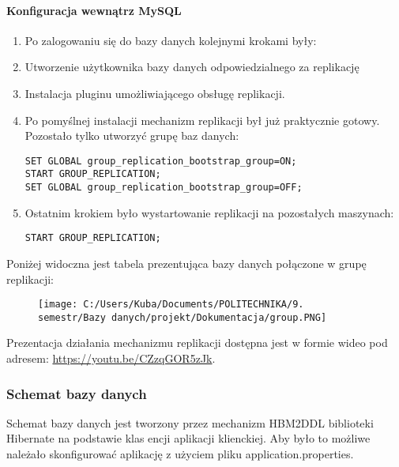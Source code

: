 \documentclass[]{article}
\let\oldparagraph\paragraph
\renewcommand{\paragraph}[1]{\oldparagraph{#1}\mbox{}}
\begin{document}
\hypertarget{header-n75}{%
\paragraph{Konfiguracja wewnątrz MySQL}\label{header-n75}}

\begin{enumerate}
\def\labelenumi{\arabic{enumi}.}
\item
  Po zalogowaniu się do bazy danych kolejnymi krokami były:
\item
  Utworzenie użytkownika bazy danych odpowiedzialnego za replikację
\item
  Instalacja pluginu umożliwiającego obsługę replikacji.
\item
  Po pomyślnej instalacji mechanizm replikacji był już praktycznie
  gotowy. Pozostało tylko utworzyć grupę baz danych:

\begin{verbatim}
SET GLOBAL group_replication_bootstrap_group=ON;
START GROUP_REPLICATION;
SET GLOBAL group_replication_bootstrap_group=OFF;
\end{verbatim}
\item
  Ostatnim krokiem było wystartowanie replikacji na pozostałych
  maszynach:

\begin{verbatim}
START GROUP_REPLICATION;
\end{verbatim}
\end{enumerate}

Poniżej widoczna jest tabela prezentująca bazy danych połączone w grupę
replikacji:

\begin{figure}
\centering
\texttt{[image: C:/Users/Kuba/Documents/POLITECHNIKA/9. semestr/Bazy danych/projekt/Dokumentacja/group.PNG]}
\caption{}
\end{figure}

Prezentacja działania mechanizmu replikacji dostępna jest w formie wideo
pod adresem: \url{https://youtu.be/CZzqGOR5zJk}.

\hypertarget{header-n100}{%
\subsubsection{Schemat bazy danych}\label{header-n100}}

Schemat bazy danych jest tworzony przez mechanizm HBM2DDL biblioteki
Hibernate na podstawie klas encji aplikacji klienckiej. Aby było to
możliwe należało skonfigurować aplikację z użyciem pliku
application.properties.
\end{document}
